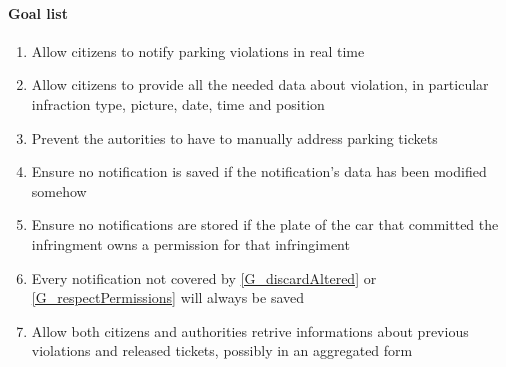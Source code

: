 \documentclass{article}
\newcommand{\enum}[1]{\texttt{#1.\arabic*}}
\begin{document}
\paragraph{Goal list}
\begin{enumerate}[label=\enum{G}]
	\item  \label{G_realTime}Allow citizens to notify parking violations in real time
	\item \label{G_allData}Allow citizens to provide all the needed data about violation, in particular infraction type, picture, date, time and position
	\item Prevent the autorities to have to manually address parking tickets
	\item \label{G_discardAltered} Ensure no notification is saved if the notification's data has been modified somehow
	\item \label{G_respectPermissions} Ensure no notifications are stored if the plate of the car that committed the infringment owns a permission for that infringiment
	\item \label{G_storeFine} Every notification not covered by \ref{G_discardAltered} or \ref{G_respectPermissions} will always be saved
	\item \label{G_statistics}Allow both citizens and authorities retrive informations about previous violations and released tickets, possibly in an aggregated form 
\end{enumerate}
\end{document}
